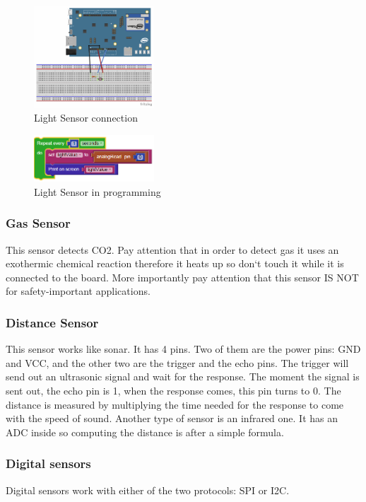 \begin{figure}[ht]
    \centering
    \includegraphics[width=0.4\textwidth]{figures/Light Sensor connection.png}
    \caption{Light Sensor connection}
\end{figure}
\begin{figure}[ht]
    \centering
    \includegraphics[width=0.4\textwidth]{figures/Light Sensor in programming.png}
    \caption{Light Sensor in programming}
\end{figure}

\subsubsection{Gas Sensor}
This sensor detects CO2. Pay attention that in order to detect gas it uses an exothermic chemical reaction therefore it heats up so don`t touch it while it is connected to the board. More importantly pay attention that this sensor IS NOT for safety-important applications.

\subsubsection{Distance Sensor}
This sensor works like sonar. It has 4 pins. Two of them are the power pins: GND and VCC, and the other two are the trigger and the echo pins. The trigger will send out an ultrasonic signal and wait for the response. The moment the signal is sent out, the echo pin is 1, when the response comes, this pin turns to 0. The distance is measured by multiplying the time needed for the response to come with the speed of sound.  Another type of sensor is an infrared one. It has an ADC inside so computing the distance is after a simple formula.

\subsubsection{Digital sensors}
Digital sensors work with either of the two protocols: SPI or I2C.


